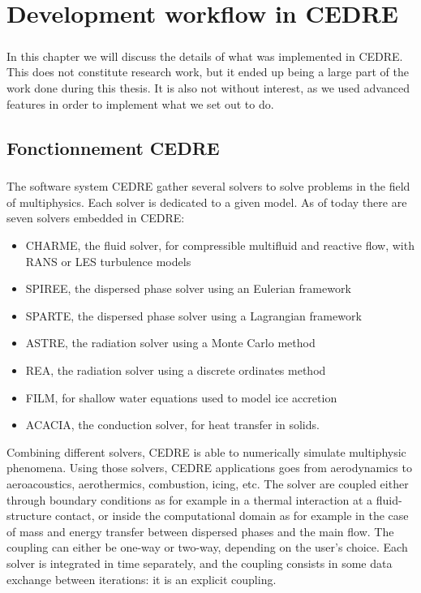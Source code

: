 \chapter{Development workflow in CEDRE}

  \paragraph{}
  In this chapter we will discuss the details of what was implemented in CEDRE.
  This does not constitute research work, but it ended up being a large part of the work done during this thesis.
  It is also not without interest, as we used advanced features in order to implement what we set out to do.


  \section{Fonctionnement CEDRE}

    \paragraph{}
    The software system CEDRE \cite{ReflochCourbetMurroneEtAl2011} gather several solvers to solve problems in the field of multiphysics.
    Each solver is dedicated to a given model.
    As of today there are seven solvers embedded in CEDRE:
    \begin{itemize}
      \item CHARME, the fluid solver, for compressible multifluid and reactive flow, with RANS or LES turbulence models
      \item SPIREE, the dispersed phase solver using an Eulerian framework
      \item SPARTE, the dispersed phase solver using a Lagrangian framework
      \item ASTRE, the radiation solver using a Monte Carlo method
      \item REA, the radiation solver using a discrete ordinates method
      \item FILM, for shallow water equations used to model ice accretion
      \item ACACIA, the conduction solver, for heat transfer in solids.
    \end{itemize}
    Combining different solvers, CEDRE is able to numerically simulate multiphysic phenomena.
    Using those solvers, CEDRE applications goes from aerodynamics to aeroacoustics, aerothermics, combustion, icing, etc.
    The solver are coupled either through boundary conditions as for example in a thermal interaction at a fluid-structure contact, or inside the computational domain as for example in the case of mass and energy transfer between dispersed phases and the main flow.
    The coupling can either be one-way or two-way, depending on the user's choice.
    Each solver is integrated in time separately, and the coupling consists in some data exchange between iterations: it is an explicit coupling.

